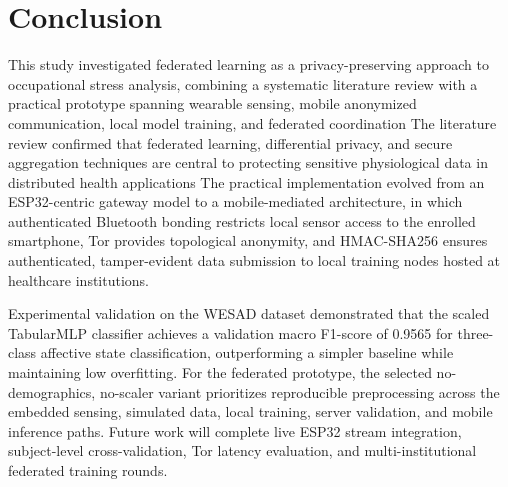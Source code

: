 \documentclass[12pt]{article}
\newcommand{\removido}[1]{{\color{COR_REMOVIDO}#1}}
\begin{document}
\section{Conclusion}

\removido{This study investigated federated learning as a privacy-preserving approach to occupational stress analysis, combining a systematic literature review with a practical prototype spanning wearable sensing, mobile anonymized communication, local model training, and federated coordination} The literature review confirmed that federated learning, differential privacy, and secure aggregation techniques are central to protecting sensitive physiological data in distributed health applications The practical implementation evolved from an ESP32-centric gateway model to a mobile-mediated architecture, in which authenticated Bluetooth bonding restricts local sensor access to the enrolled smartphone, Tor provides topological anonymity, and HMAC-SHA256 ensures authenticated, tamper-evident data submission to local training nodes hosted at healthcare institutions.

Experimental validation on the WESAD dataset demonstrated that the scaled TabularMLP classifier achieves a validation macro F1-score of 0.9565 for three-class affective state classification, outperforming a simpler baseline while maintaining low overfitting. For the federated prototype, the selected no-demographics, no-scaler variant prioritizes reproducible preprocessing across the embedded sensing, simulated data, local training, server validation, and mobile inference paths. Future work will complete live ESP32 stream integration, subject-level cross-validation, Tor latency evaluation, and multi-institutional federated training rounds.




\end{document}
